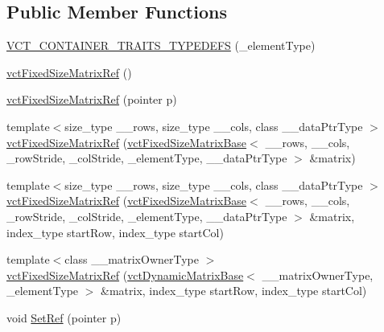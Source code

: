 \subsection*{Public Member Functions}
\begin{DoxyCompactItemize}
\item 
\hyperlink{classvct_fixed_size_matrix_ref_a60ff4f7afb7d9ab64532a0bdc1b79643}{V\-C\-T\-\_\-\-C\-O\-N\-T\-A\-I\-N\-E\-R\-\_\-\-T\-R\-A\-I\-T\-S\-\_\-\-T\-Y\-P\-E\-D\-E\-F\-S} (\-\_\-element\-Type)
\item 
\hyperlink{classvct_fixed_size_matrix_ref_a71f82d9a9b48de55cc1b82ce4388de9f}{vct\-Fixed\-Size\-Matrix\-Ref} ()
\item 
\hyperlink{classvct_fixed_size_matrix_ref_a376fb099bf980271a9b419950a35cd14}{vct\-Fixed\-Size\-Matrix\-Ref} (pointer p)
\item 
{\footnotesize template$<$size\-\_\-type \-\_\-\-\_\-rows, size\-\_\-type \-\_\-\-\_\-cols, class \-\_\-\-\_\-data\-Ptr\-Type $>$ }\\\hyperlink{classvct_fixed_size_matrix_ref_a5e367177e08e21d5f8a67ff8c64e1123}{vct\-Fixed\-Size\-Matrix\-Ref} (\hyperlink{classvct_fixed_size_matrix_base}{vct\-Fixed\-Size\-Matrix\-Base}$<$ \-\_\-\-\_\-rows, \-\_\-\-\_\-cols, \-\_\-row\-Stride, \-\_\-col\-Stride, \-\_\-element\-Type, \-\_\-\-\_\-data\-Ptr\-Type $>$ \&matrix)
\item 
{\footnotesize template$<$size\-\_\-type \-\_\-\-\_\-rows, size\-\_\-type \-\_\-\-\_\-cols, class \-\_\-\-\_\-data\-Ptr\-Type $>$ }\\\hyperlink{classvct_fixed_size_matrix_ref_a4f298a0a0d6352ae3ccc4589f885902c}{vct\-Fixed\-Size\-Matrix\-Ref} (\hyperlink{classvct_fixed_size_matrix_base}{vct\-Fixed\-Size\-Matrix\-Base}$<$ \-\_\-\-\_\-rows, \-\_\-\-\_\-cols, \-\_\-row\-Stride, \-\_\-col\-Stride, \-\_\-element\-Type, \-\_\-\-\_\-data\-Ptr\-Type $>$ \&matrix, index\-\_\-type start\-Row, index\-\_\-type start\-Col)
\item 
{\footnotesize template$<$class \-\_\-\-\_\-matrix\-Owner\-Type $>$ }\\\hyperlink{classvct_fixed_size_matrix_ref_a1f2a473bd11829f1c76601a0e9617f54}{vct\-Fixed\-Size\-Matrix\-Ref} (\hyperlink{classvct_dynamic_matrix_base}{vct\-Dynamic\-Matrix\-Base}$<$ \-\_\-\-\_\-matrix\-Owner\-Type, \-\_\-element\-Type $>$ \&matrix, index\-\_\-type start\-Row, index\-\_\-type start\-Col)
\item 
void \hyperlink{classvct_fixed_size_matrix_ref_af786a2ba2f39a269bbebd1284bc0a3a7}{Set\-Ref} (pointer p)
\item 

\end{DoxyCompactItemize}
